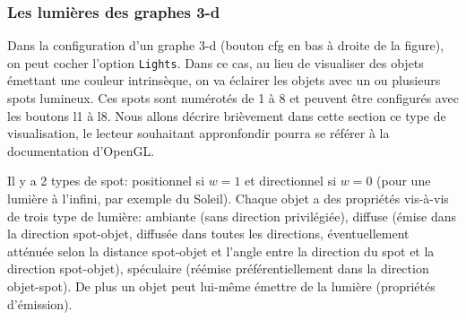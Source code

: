 \documentclass[a4paper,11pt]{article}
\begin{document}
\subsubsection{Les lumi\`eres des graphes 3-d} \label{sec:lumieres}
Dans la configuration d'un graphe 3-d (bouton cfg en bas \`a droite
de la figure), on peut cocher l'option \verb|Lights|. Dans ce cas,
au lieu de visualiser des objets \'emettant une couleur intrins\`eque,
on va \'eclairer les objets avec un ou plusieurs spots lumineux. Ces
spots sont num\'erot\'es de 1 \`a 8 et peuvent \^etre configur\'es avec les
boutons l1 \`a l8. Nous allons d\'ecrire bri\`evement dans cette section ce
type de visualisation, le lecteur souhaitant appronfondir pourra
se r\'ef\'erer \`a la documentation d'OpenGL.

Il y a 2 types de spot: positionnel si $w=1$ et directionnel si $w=0$
(pour une lumi\`ere \`a l'infini, par exemple du Soleil). Chaque objet
a des propri\'et\'es vis-\`a-vis de trois type de lumi\`ere: ambiante (sans
direction privil\'egi\'ee), diffuse (\'emise dans la direction spot-objet,
diffus\'ee dans toutes les directions,
\'eventuellement att\'enu\'ee selon la distance spot-objet et l'angle entre
la direction du spot et la direction spot-objet), sp\'eculaire (r\'e\'emise
pr\'ef\'erentiellement dans la direction objet-spot). De plus un objet
peut lui-m\^eme \'emettre de la lumi\`ere (propri\'et\'es d'\'emission).
\end{document}

